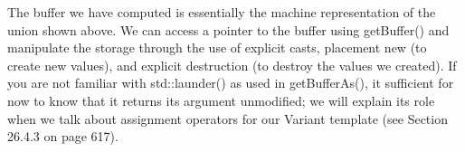The buffer we have computed is essentially the machine representation of the union shown above. We can access a pointer to the buffer using getBuffer() and manipulate the storage through the use of explicit casts, placement new (to create new values), and explicit destruction (to destroy the values we created). If you are not familiar with std::launder() as used in getBufferAs(), it sufficient for now to know that it returns its argument unmodified; we will explain its role when we talk about assignment operators for our Variant template (see Section 26.4.3 on page 617).






































